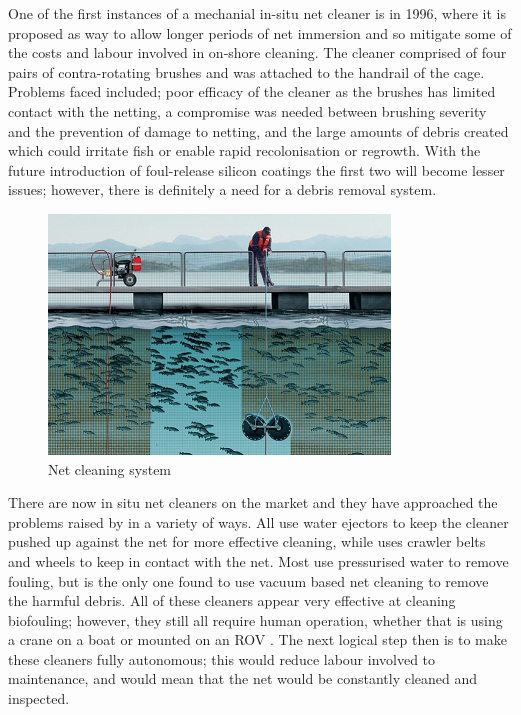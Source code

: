 \documentclass[11.5pt, twoside, a4paper]{article}
\begin{document}
One of the first instances of a mechanial in-situ net cleaner is \cite{hodson2000biofouling} in 1996, where it is proposed as way to allow longer periods of net immersion and so mitigate some of the costs and labour involved in on-shore cleaning. The cleaner comprised of four pairs of contra-rotating brushes and was attached to the handrail of the cage. Problems faced included; poor efficacy of the cleaner as the brushes has limited contact with the netting, a compromise was needed between brushing severity and the prevention of damage to netting, and the large amounts of debris created which could irritate fish or enable rapid recolonisation or regrowth. With the future introduction of foul-release silicon coatings the first two will become lesser issues; however, there is definitely a need for a debris removal system. 

\begin{figure}
\begin{center}
\includegraphics{cleaner.png}
\caption{Net cleaning system \cite{AKVA} \label{fig:cleaner}}
\end{center}
\end{figure}


There are now in situ net cleaners on the market \cite{Yanmar,AKVA,MPI,Hughesbrochure,MIC} and they have approached the problems raised by \cite{hodson1997biofouling} in a variety of ways. All \cite{AKVA,Hughesbrochure,MPI} use water ejectors to keep the cleaner pushed up against the net for more effective cleaning, while \cite{Yanmar} uses crawler belts and wheels to keep in contact with the net. Most use pressurised water to remove fouling, but \cite{MIC} is the only one found to use vacuum based net cleaning to remove the harmful debris. All of these cleaners appear very effective at cleaning biofouling; however, they still all require human operation, whether that is using a crane on a boat \cite{AKVA} or mounted on an ROV \cite{Hughesbrochure}. The next logical step then is to make these cleaners fully autonomous; this would reduce labour involved to maintenance, and would mean that the net would be constantly cleaned and inspected.
\end{document}
